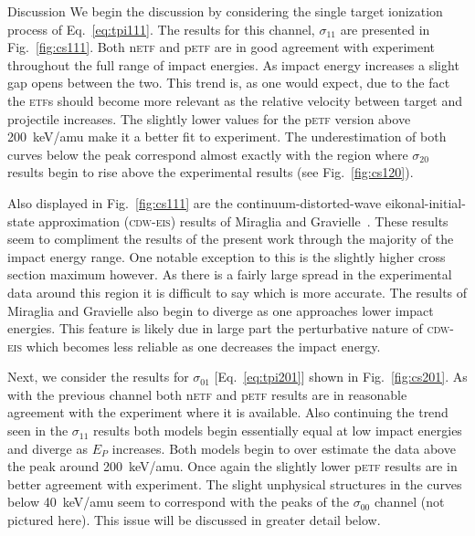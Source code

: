 \documentclass[aps, pra, reprint, groupedaddress, amsfonts, longbibliography,
               amsmath, amssymb, showpacs, nofootinbib]{revtex4-1}
\begin{document}
\begin{section}{Discussion \label{sec:disc}}
   We begin the discussion by considering the single target ionization process of Eq.~\eqref{eq:tpi111}.
   The results for this channel, $\sigma_{11}$ are presented in Fig.~\ref{fig:cs111}. Both n\textsc{etf}
   and p\textsc{etf} are in good agreement with experiment throughout the full range of impact energies.
   As impact energy increases a slight gap opens between the two. This trend is, as one would expect,
   due to the fact the \textsc{etf}s should become more relevant as the relative velocity between
   target and projectile increases. The slightly lower values for the p\textsc{etf} version above
   200~keV/amu make it a better fit to experiment. The underestimation of both curves below the peak
   correspond almost exactly with the region where $\sigma_{20}$ results begin to rise above the
   experimental results (see Fig.~\ref{fig:cs120}).

   Also displayed in Fig.~\ref{fig:cs111} are the continuum-distorted-wave eikonal-initial-state
   approximation (\textsc{cdw-eis}) results of Miraglia and Gravielle~\cite{MG-10}. These results seem
   to compliment the results of the present work through the majority of the impact energy range. One
   notable exception to this is the slightly higher cross section maximum however. As there is a fairly
   large spread in the experimental data around this region it is difficult to say which is more
   accurate. The results of Miraglia and Gravielle also begin to diverge as one approaches lower
   impact energies. This feature is likely due in large part the perturbative nature of \textsc{cdw-eis}
   which becomes less reliable as one decreases the impact energy.

   Next, we consider the results for $\sigma_{01}$ [Eq.~\eqref{eq:tpi201}] shown in
   Fig.~\ref{fig:cs201}. As with the previous channel both n\textsc{etf} and p\textsc{etf} results are
   in reasonable agreement with the experiment where it is available. Also continuing the trend seen in
   the $\sigma_{11}$ results both models begin essentially equal at low impact energies and diverge as
   $E_P$ increases. Both models begin to over estimate the data above the peak around 200~keV/amu. Once
   again the slightly lower p\textsc{etf} results are in better agreement with experiment. The slight
   unphysical structures in the curves below 40~keV/amu seem to correspond with the peaks of the
   $\sigma_{00}$ channel (not pictured here). This issue will be discussed in greater detail below.


\end{section}
\end{document}
